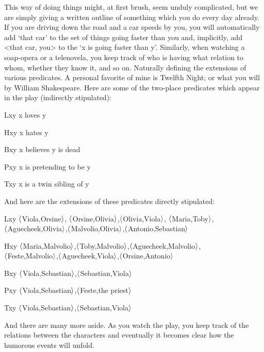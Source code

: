 This way of doing things might, at first brush, seem unduly complicated, but we are simply giving a written outline of something which you do every day already. If you are driving down the road and a car speeds by you, you will automatically add ‘that car' to the set of things going faster than you and, implicitly, add <that car, you> to the ‘x is going faster than y'. Similarly, when watching a soap-opera or a telenovela, you keep track of who is having what relation to whom, whether they know it, and so on. Naturally defining the extensions of various predicates. A personal favorite of mine is Twelfth Night; or what you will by William Shakespeare. Here are some of the two-place predicates which appear in the play (indirectly stipulated):
\begin{ekey}
\item[Lxy] x loves y
\item[Hxy] x hates y
\item[Bxy] x believes y is dead
\item[Pxy] x is pretending to be y
\item[Txy] x is a twin sibling of y
\end{ekey}
And here are the extensions of these predicates directly stipulated: 
\begin{ekey}
\item[Lxy] $\langle$Viola,Orsine$\rangle$, $\langle$Orsine,Olivia$\rangle$,$\langle$Olivia,Viola$\rangle$, $\langle$Maria,Toby$\rangle$,\\$\langle$Aguecheek,Olivia$\rangle$,$\langle$Malvolio,Olivia$\rangle$,$\langle$Antonio,Sebastian$\rangle$
\item[Hxy] $\langle$Maria,Malvolio$\rangle$,$\langle$Toby,Malvolio$\rangle$,$\langle$Aguecheek,Malvolio$\rangle$,\\$\langle$Feste,Malvolio$\rangle$,$\langle$Aguecheek,Viola$\rangle$,$\langle$Orsine,Antonio$\rangle$
\item[Bxy] $\langle$Viola,Sebastian$\rangle$,$\langle$Sebastian,Viola$\rangle$
\item[Pxy] $\langle$Viola,Sebastian$\rangle$,$\langle$Feste,the priest$\rangle$
\item[Txy] $\langle$Viola,Sebastian$\rangle$,$\langle$Sebastian,Viola$\rangle$
\end{ekey}
And there are many more aside. As you watch the play, you keep track of the relations between the characters and eventually it becomes clear how the humorous events will unfold.

